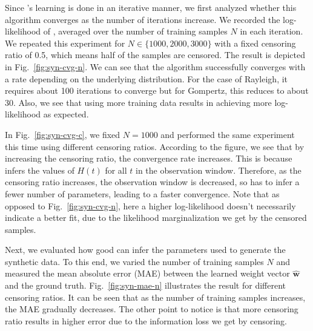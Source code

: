 Since \npglm's learning is done in an iterative manner, we first analyzed whether this algorithm converges as the number of iterations increase. We recorded the log-likelihood of \npglm, averaged over the number of training samples $N$ in each iteration. We repeated this experiment for $N\in\{1000,2000,3000\}$ with a fixed censoring ratio of 0.5, which means half of the samples are censored. The result is depicted in Fig.~\ref{fig:syn-cvg-n}. We can see that the algorithm successfully converges with a rate depending on the underlying distribution. For the case of Rayleigh, it requires about 100 iterations to converge but for Gompertz, this reduces to about 30. Also, we see that using more training data results in achieving more log-likelihood as expected.



In Fig.~\ref{fig:syn-cvg-c}, we fixed $N=1000$ and performed the same experiment this time using different censoring ratios. According to the figure, we see that by increasing the censoring ratio, the convergence rate increases. This is because \npglm infers the values of $H(t)$ for all $t$ in the observation window. Therefore, as the censoring ratio increases, the observation window is decreased, so \npglm has to infer a fewer number of parameters, leading to a faster convergence. Note that as opposed to Fig.~\ref{fig:syn-cvg-n}, here a higher log-likelihood doesn't necessarily indicate a better fit, due to the likelihood marginalization we get by the censored samples.



Next, we evaluated how good \npglm can infer the parameters used to generate the synthetic data. To this end, we varied the number of training samples $N$ and measured the mean absolute error (MAE) between the learned weight vector $\hat{\mathbf{w}}$ and the ground truth. Fig.~\ref{fig:syn-mae-n} illustrates the result for different censoring ratios. It can be seen that as the number of training samples increases, the MAE gradually decreases. The other point to notice is that more censoring ratio results in higher error due to the information loss we get by censoring.



